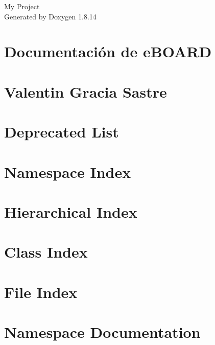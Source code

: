 \documentclass[twoside]{book}
\newcommand{\+}{\discretionary{\mbox{\scriptsize$\hookleftarrow$}}{}{}}
\newcommand{\clearemptydoublepage}{%
  \newpage{\pagestyle{empty}\cleardoublepage}%
}
\begin{document}
\hypersetup{pageanchor=false,
             bookmarksnumbered=true,
             pdfencoding=unicode
            }
\begin{titlepage}
\vspace*{7cm}
\begin{center}%
{\Large My Project }\\
\vspace*{1cm}
{\large Generated by Doxygen 1.8.14}\\
\end{center}
\end{titlepage}
\clearemptydoublepage
{}
\tableofcontents
\clearemptydoublepage
{}
\hypersetup{pageanchor=true}

\chapter{Documentación de e\+B\+O\+A\+RD}
\label{index}\hypertarget{index}{}
\chapter{Valentin Gracia Sastre}
\label{md_ResumenEBOARD}

\chapter{Deprecated List}
\label{deprecated}

\chapter{Namespace Index}

\chapter{Hierarchical Index}

\chapter{Class Index}

\chapter{File Index}

\chapter{Namespace Documentation}



\end{document}
